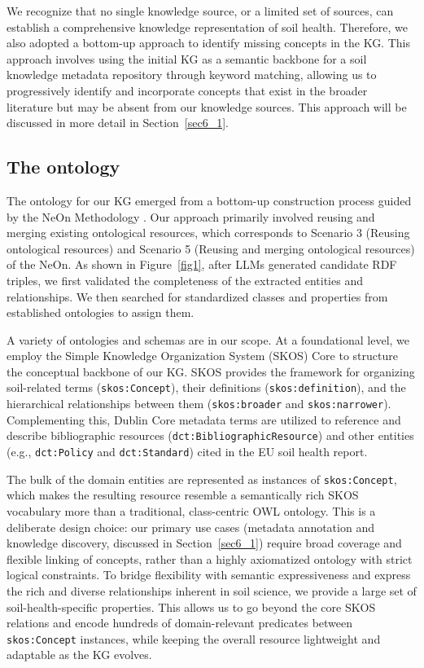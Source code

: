 \documentclass[preprint,12pt]{elsarticle}
\begin{document}
We recognize that no single knowledge source, or a limited set of sources, can establish a comprehensive knowledge representation of soil health. Therefore, we also adopted a bottom-up approach to identify missing concepts in the KG. This approach involves using the initial KG as a semantic backbone for a soil knowledge metadata repository through keyword matching, allowing us to progressively identify and incorporate concepts that exist in the broader literature but may be absent from our knowledge sources. This approach will be discussed in more detail in Section~\ref{sec6_1}.

\subsection{The ontology} \label{sec3_2}
The ontology for our KG emerged from a bottom-up construction process guided by the NeOn Methodology \citep{doi:10.3233/AO-150145}. Our approach primarily involved reusing and merging existing ontological resources, which corresponds to Scenario 3 (Reusing ontological resources) and Scenario 5 (Reusing and merging ontological resources) of the NeOn. As shown in Figure~\ref{fig1}, after LLMs generated candidate RDF triples, we first validated the completeness of the extracted entities and relationships. We then searched for standardized classes and properties from established ontologies to assign them.

A variety of ontologies and schemas are in our scope. At a foundational level, we employ the Simple Knowledge Organization System (SKOS) Core \citep{10.5555/1383465.1383467} to structure the conceptual backbone of our KG. SKOS provides the framework for organizing soil-related terms (\texttt{skos:Concept}), their definitions (\texttt{skos:definition}), and the hierarchical relationships between them (\texttt{skos:broader} and \texttt{skos:narrower}). Complementing this, Dublin Core metadata terms \citep{https://doi.org/10.1002/bult.70} are utilized to reference and describe bibliographic resources (\texttt{dct:BibliographicResource}) and other entities (e.g., \texttt{dct:Policy} and \texttt{dct:Standard}) cited in the EU soil health report.

The bulk of the domain entities are represented as instances of \texttt{skos:Concept}, which makes the resulting resource resemble a semantically rich SKOS vocabulary more than a traditional, class-centric OWL ontology. This is a deliberate design choice: our primary use cases (metadata annotation and knowledge discovery, discussed in Section~\ref{sec6_1}) require broad coverage and flexible linking of concepts, rather than a highly axiomatized ontology with strict logical constraints. To bridge flexibility with semantic expressiveness and express the rich and diverse relationships inherent in soil science, we provide a large set of soil-health-specific properties. This allows us to go beyond the core SKOS relations and encode hundreds of domain-relevant predicates between \texttt{skos:Concept} instances, while keeping the overall resource lightweight and adaptable as the KG evolves.
\end{document}
